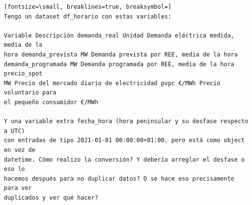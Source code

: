 \documentclass[12pt,a4paper,oneside]{book}
\begin{document}
\begin{iaprompt}
\begin{Verbatim}[fontsize=\small, breaklines=true, breaksymbol=]
Tengo un dataset df_horario con estas variables:

Variable Descripción demanda_real Unidad Demanda eléctrica medida, media de la
hora demanda_prevista MW Demanda prevista por REE, media de la hora
demanda_programada MW Demanda programada por REE, media de la hora precio_spot
MW Precio del mercado diario de electricidad pvpc €/MWh Precio voluntario para
el pequeño consumidor €/MWh

Y una variable extra fecha_hora (hora peninsular y su desfase respecto a UTC)
con entradas de tipo 2021-01-01 00:00:00+01:00, pero está como object en vez de
datetime. Cómo realizo la conversión? Y debería arreglar el desfase o eso lo
hacemos después para no duplicar datos? O se hace eso precisamente para ver
duplicados y ver qué hacer?
\end{Verbatim}
\end{iaprompt}
\end{document}
